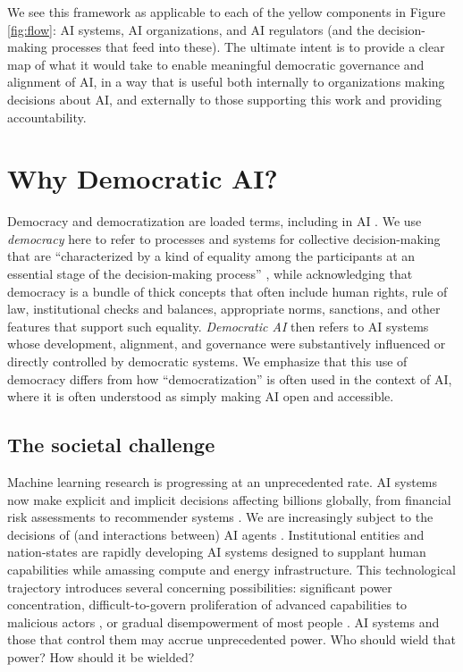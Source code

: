 \documentclass{article}
\begin{document}
    We see this framework as applicable to each of the yellow components in Figure \ref{fig:flow}: AI systems, AI organizations, and AI regulators (and the decision-making processes that feed into these). The ultimate intent is to provide a clear map of what it would take to enable meaningful democratic governance and alignment of AI, in a way that is useful both internally to organizations making decisions about AI, and externally to those supporting this work and providing accountability. 

\section{Why Democratic AI?}

    Democracy and democratization are loaded terms, including in AI \cite{seger2023,lin2024democratizing}. We use \textit{democracy} here to refer to processes and systems for collective decision-making that are ``characterized by a kind of equality among the participants at an essential stage of the decision-making process'' \cite{christiano2024}, while acknowledging that democracy is a bundle of thick concepts that often include human rights, rule of law, institutional checks and balances, appropriate norms, sanctions, and other features that support such equality. \textit{Democratic AI} then refers to AI systems whose development, alignment, and governance were substantively influenced or directly controlled by democratic systems. We emphasize that this use of democracy differs from how ``democratization'' is often used in the context of AI, where it is often understood as simply making AI open and accessible.

\subsection{The societal challenge}

    Machine learning research is progressing at an unprecedented rate. AI systems now make explicit and implicit decisions affecting billions globally, from financial risk assessments \citep{sadok2022artificial, ramakrishnan2024employing} to recommender systems \citep{zhang2021artificial, deldjoo2024review}. We are increasingly subject to the decisions of (and interactions between) AI agents \citep{chan2023harms, kolt2025governing, kasirzadeh2025characterizing}. Institutional entities and nation-states are rapidly developing AI systems designed to supplant human capabilities while amassing compute and energy infrastructure. This technological trajectory introduces several concerning possibilities: significant power concentration, difficult-to-govern proliferation of advanced capabilities to malicious actors \citep{allen2024}, or gradual disempowerment of most people \citep{kulveit2025, drago2025}. AI systems and those that control them may accrue unprecedented power. Who should wield that power? How should it be wielded?
\end{document}
